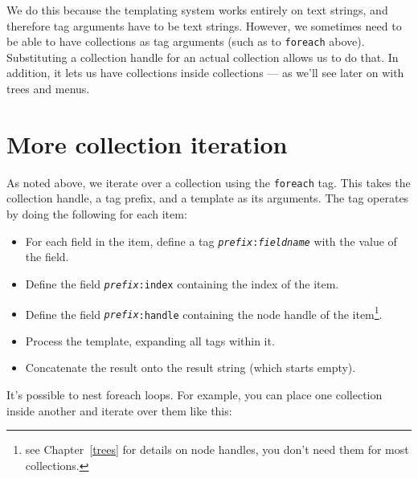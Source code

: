 We do this because the templating system works entirely on text strings,
and therefore tag arguments have to be text strings. However, we sometimes need
to be able to have collections as tag arguments (such as to \texttt{foreach}
above). Substituting a collection handle for an actual collection allows
us to do that. In addition, it lets us have collections inside collections
--- as we'll see later on with trees and menus.

\section{More collection iteration}
\label{moreiter}
As noted above, we iterate over a collection using the \texttt{foreach}
tag. This takes the collection handle, a tag prefix, and a template as its arguments.
The tag operates by doing the following for each item:
\begin{itemize}
\item For each field in the item, define a tag \texttt{\emph{prefix}:\emph{fieldname}} with the value
of the field.
\item Define the field \texttt{\emph{prefix}:index} containing the index of the item.
\item Define the field \texttt{\emph{prefix}:handle} containing the node handle of the item\footnote{see Chapter~\ref{trees} for details on node handles, you don't need them for most collections.}.
\item Process the template, expanding all tags within it.
\item Concatenate the result onto the result string (which starts empty).
\end{itemize}
\clearpage

It's possible to nest foreach loops. For example, you can place one collection inside another and iterate
over them like this:

